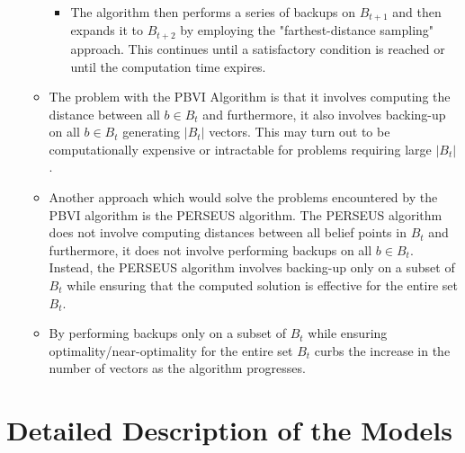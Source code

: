 \documentclass[12pt, draftcls, onecolumn]{IEEEtran}
\begin{document}
\begin{itemize}
\begin{itemize}
\begin{itemize}
            \item The algorithm then performs a series of backups on $B_{t+1}$ and then expands it to $B_{t+2}$ by employing the "farthest-distance sampling" approach. This continues until a satisfactory condition is reached or until the computation time expires.
        \end{itemize}
        \item The problem with the PBVI Algorithm is that it involves computing the distance between all $b \in B_t$ and furthermore, it also involves backing-up on all $b \in B_t$ generating $|B_t|$ vectors. This may turn out to be computationally expensive or intractable for problems requiring large $|B_t|$.
        \item Another approach which would solve the problems encountered by the PBVI algorithm is the PERSEUS algorithm. The PERSEUS algorithm does not involve computing distances between all belief points in $B_t$ and furthermore, it does not involve performing backups on all $b \in B_t$. Instead, the PERSEUS algorithm involves backing-up only on a subset of $B_t$ while ensuring that the computed solution is effective for the entire set $B_t$.
        \item By performing backups only on a subset of $B_t$ while ensuring optimality/near-optimality for the entire set $B_t$ curbs the increase in the number of vectors as the algorithm progresses.
    \end{itemize}
\end{itemize}
\clearpage
\section{Detailed Description of the Models}
\end{document}
